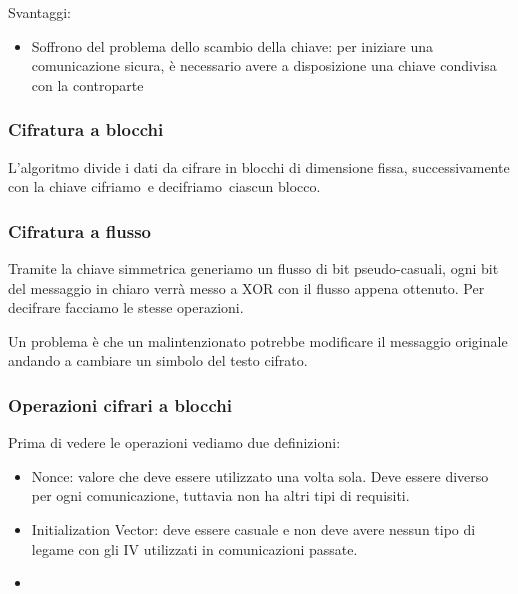 \documentclass[
]{article}
\providecommand{\tightlist}{%
  \setlength{\itemsep}{0pt}\setlength{\parskip}{0pt}}
\begin{document}
{}

{Svantaggi:}

\begin{itemize}
\tightlist
\item
  {Soffrono del problema dello scambio della chiave: per iniziare una
  comunicazione sicura, è necessario avere a disposizione una chiave
  condivisa con la controparte}
\end{itemize}

\subsubsection{\texorpdfstring{{Cifratura a
blocchi}}{Cifratura a blocchi}}\label{h.baertcvofajh}

{L'algoritmo divide i dati da cifrare in blocchi di dimensione fissa,
successivamente con la chiave }{cifriamo}{~e }{decifriamo}{~ciascun
blocco.}

\subsubsection{\texorpdfstring{{Cifratura a
flusso}}{Cifratura a flusso}}\label{h.sunf8sbf0qit}

{Tramite la chiave simmetrica generiamo un flusso di bit pseudo-casuali,
ogni bit del messaggio in chiaro verrà messo a XOR con il flusso appena
ottenuto. Per decifrare facciamo le stesse operazioni.}

{Un problema è che un malintenzionato potrebbe modificare il messaggio
originale andando a cambiare un simbolo del testo cifrato.}

\subsubsection{\texorpdfstring{{Operazioni cifrari a
blocchi}}{Operazioni cifrari a blocchi}}\label{h.7etjxbh3dk0z}

{Prima di vedere le operazioni vediamo due definizioni:}

\begin{itemize}
\tightlist
\item
  {Nonce: valore che deve essere utilizzato una volta sola. Deve essere
  diverso per ogni comunicazione, tuttavia non ha altri tipi di
  requisiti.}
\item
  {Initialization Vector: deve essere casuale e non deve avere nessun
  tipo di legame con gli IV utilizzati in comunicazioni passate.}
\item
  {}
\end{itemize}
\end{document}
